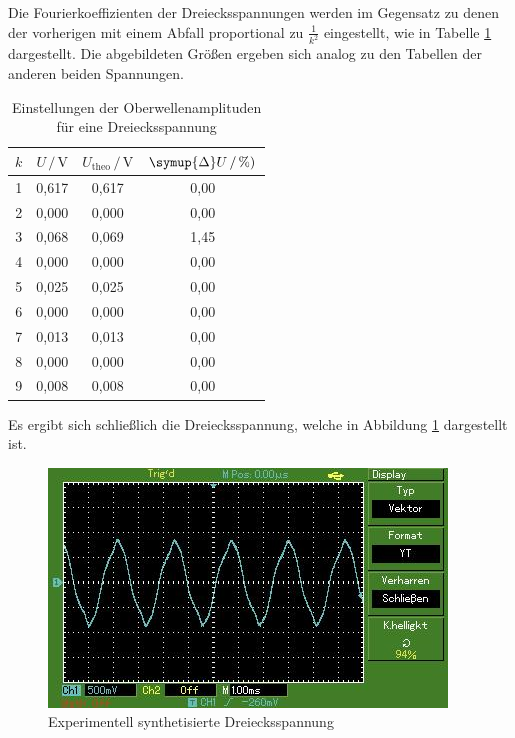 Die Fourierkoeffizienten der Dreiecksspannungen werden im Gegensatz zu denen
der vorherigen mit einem Abfall proportional zu $\frac{1}{k^2}$ eingestellt,
wie in Tabelle \ref{tab:Messdaten6} dargestellt. Die abgebildeten
Größen ergeben sich analog zu den Tabellen der anderen beiden Spannungen.

\begin{table}[H]
    \centering
    \caption{Einstellungen der Oberwellenamplituden für eine Dreiecksspannung}
    \label{tab:Messdaten6}
    \begin{tabular}{c c c c}
    \toprule
    $k$ & $U \,/\, \si{\volt}$ & $U_\text{theo} \,/\, \si{\volt}$ & $\symup{\Delta}U \,/\, \si{\percent})$ \\
    \midrule
    1 & 0,617 & 0,617 & 0,00 \\
    2 & 0,000 & 0,000 & 0,00 \\
    3 & 0,068 & 0,069 & 1,45 \\
    4 & 0,000 & 0,000 & 0,00 \\
    5 & 0,025 & 0,025 & 0,00 \\
    6 & 0,000 & 0,000 & 0,00 \\
    7 & 0,013 & 0,013 & 0,00 \\
    8 & 0,000 & 0,000 & 0,00 \\
    9 & 0,008 & 0,008 & 0,00 \\
    \bottomrule
    \end{tabular}
\end{table}

Es ergibt sich schließlich die Dreiecksspannung, welche in Abbildung \ref{fig:Ex3}
dargestellt ist.

\begin{figure}[H]
    \centering
    \includegraphics[scale=0.7]{content/sinus.jpg}
    \caption{Experimentell synthetisierte Dreiecksspannung}
    \label{fig:Ex3}
\end{figure}




